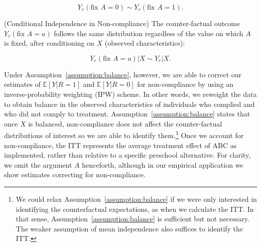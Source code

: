 \begin{equation}
Y_{r} \left(\text{fix } A = 0 \right) \sim Y_{r} \left(\text{fix } A = 1 \right). 
\end{equation}

\begin{assumption} \normalfont \label{assumption:balance} (Conditional Independence in Non-compliance) The counter-factual outcome $Y_{r} \left(\text{fix } A = a \right)$ follows the same distribution regardless of the value on which $A$ is fixed, after conditioning on $X$ (observed characteristics): 

\begin{equation}
Y_{r} \left(\text{fix } A = a \right) | X \sim Y_{r} | X. 
\end{equation}

\end{assumption}

\noindent Under Assumption~\ref{assumption:balance}, however, we are able to correct our estimates of $\mathbb{E} \left[ Y | R = 1 \right]$ and $\mathbb{E} \left[ Y | R = 0 \right]$ for non-compliance by using an inverse-probability weighting (IPW) scheme. In other words, we reweight the data to obtain balance in the observed characteristics of individuals who complied and who did not comply to treatment. Assumption~\ref{assumption:balance} states that once $X$ is balanced, non-compliance does not affect the counter-factual distributions of interest so we are able to identify them.\footnote{We could relax Assumption~\ref{assumption:balance} if we were only interested in identifying the counterfactual expectations, as when we calculate the ITT. In that sense, Assumption~\ref{assumption:balance} is sufficient but not necessary. The weaker assumption of mean independence also suffices to identify the ITT.} Once we account for non-compliance, the ITT represents the average treatment effect of ABC as implemented, rather than relative to a specific preschool alternative. For clarity, we omit the argument $A$ henceforth, although in our empirical application we show estimates correcting for non-compliance.\\

